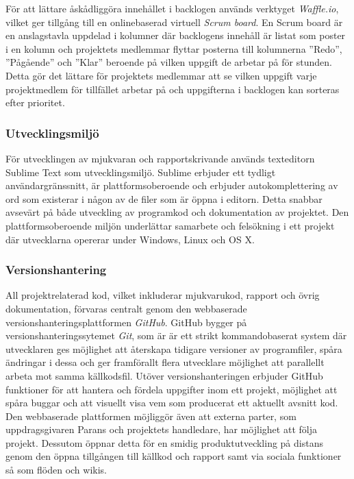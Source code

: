 \documentclass{article}
\begin{document}
            \noindent För att lättare åskådliggöra innehållet i backlogen används verktyget \textit{Waffle.io}, vilket ger tillgång till en onlinebaserad virtuell \textit{Scrum board}. En Scrum board är en anslagstavla uppdelad i kolumner där backlogens innehåll är listat som poster i en kolumn och projektets medlemmar flyttar posterna till kolumnerna ''Redo'', ''Pågående'' och ''Klar''
            beroende på vilken uppgift de arbetar på för stunden. Detta gör det lättare för projektets medlemmar att se vilken uppgift varje projektmedlem för tillfället arbetar på och uppgifterna i backlogen kan sorteras efter prioritet.

            \subsubsection{Utvecklingsmiljö} %
            \label{subsub:utvecklingsmiljo}
            \noindent För utvecklingen av mjukvaran och rapportskrivande används texteditorn Sublime Text som utvecklingsmiljö. Sublime erbjuder ett tydligt användargränssnitt, är plattformsoberoende och erbjuder autokomplettering av ord som existerar i någon av de filer som är öppna i editorn. Detta snabbar avsevärt på både utveckling av programkod och dokumentation av projektet. Den plattformsoberoende miljön underlättar samarbete och felsökning i ett projekt där utvecklarna opererar under Windows, Linux och OS X. 

            \subsubsection{Versionshantering} %
            \label{subsub:versionshantering} %
            \noindent All projektrelaterad kod, vilket inkluderar mjukvarukod, rapport och övrig dokumentation, förvaras centralt genom den webbaserade versionshanteringsplattformen \textit{GitHub}.
            GitHub bygger på versionshanteringssytemet \textit{Git}, som är är ett strikt kommandobaserat system där utvecklaren ges möjlighet att återskapa tidigare versioner av programfiler, spåra ändringar i dessa och ger framförallt flera utvecklare möjlighet att parallellt arbeta mot samma källkodsfil. Utöver versionshanteringen erbjuder GitHub funktioner för att hantera och fördela uppgifter inom ett projekt, möjlighet att spåra buggar och att visuellt visa vem som producerat ett aktuellt avsnitt kod.\\

            \noindent Den webbaserade plattformen möjliggör även att externa parter, som uppdragsgivaren Parans och projektets handledare, har möjlighet att följa projekt. Dessutom öppnar detta för en smidig produktutveckling på distans genom den öppna tillgången till källkod och rapport samt via sociala funktioner så som flöden och wikis. 
\end{document}

